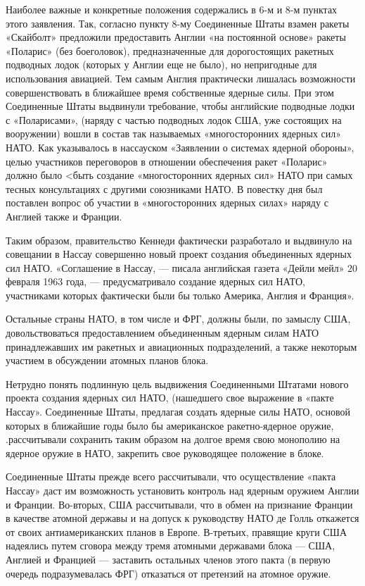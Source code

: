 \documentclass[12pt, a4paper, openany]{book}
\begin{document}
	Наиболее важные и конкретные положения содержались в 6-м и 8-м пунктах этого заявления. Так, согласно пункту 8-му Соединенные Штаты взамен ракеты «Скайболт» предложили предоставить Англии «на постоянной основе» ракеты «Поларис» (без боеголовок), предназначенные для дорогостоящих ракетных подводных лодок (которых у Англии еще не было), но непригодные для использования авиацией. Тем самым Англия практически лишалась возможности совершенствовать в ближайшее время собственные ядерные силы. При этом Соединенные Штаты выдвинули требование, чтобы английские подводные лодки с «Поларисами», (наряду с частью подводных лодок США, уже состоящих на вооружении) вошли в состав так называемых «многосторонних ядерных сил» НАТО. Как указывалось в нассауском «Заявлении о системах ядерной обороны», целью участников переговоров в отношении обеспечения ракет «Поларис» должно было <быть создание «многосторонних ядерных сил» НАТО при самых тесных консультациях с другими союзниками НАТО. В повестку дня был поставлен вопрос об участии в «многосторонних ядерных силах» наряду с Англией также и Франции.
	
	Таким образом, правительство Кеннеди фактически разработало и выдвинуло на совещании в Нассау совершенно новый проект создания объединенных ядерных сил НАТО. «Соглашение в Нассау, — писала английская газета «Дейли мейл» 20 февраля 1963 года, — предусматривало создание ядерных сил НАТО, участниками которых фактически были бы только Америка, Англия и Франция».
	
	Остальные страны НАТО, в том числе и ФРГ, должны были, по замыслу США, довольствоваться предоставлением объединенным ядерным силам НАТО принадлежавших им ракетных и авиационных подразделений, а также некоторым участием в обсуждении атомных планов блока.
	
	Нетрудно понять подлинную цель выдвижения Соединенными Штатами нового проекта создания ядерных сил НАТО, (нашедшего свое выражение в «пакте Нассау». Соединенные Штаты, предлагая создать ядерные силы НАТО, основой которых в ближайшие годы было бы американское ракетно-ядерное оружие, .рассчитывали сохранить таким образом на долгое время свою монополию на ядерное оружие в НАТО, закрепить свое руководящее положение в блоке.
	
	Соединенные Штаты прежде всего рассчитывали, что осуществление «пакта Нассау» даст им возможность установить контроль над ядерным оружием Англии и Франции. Во-вторых, США рассчитывали, что в обмен на признание Франции в качестве атомной державы и на допуск к руководству НАТО де Голль откажется от своих антиамериканских планов в Европе. В-третьих, правящие круги США надеялись путем сговора между тремя атомными державами блока — США, Англией и Францией — заставить остальных членов этого пакта (в первую очередь подразумевалась ФРГ) отказаться от претензий на атомное оружие.
	
\end{document}
